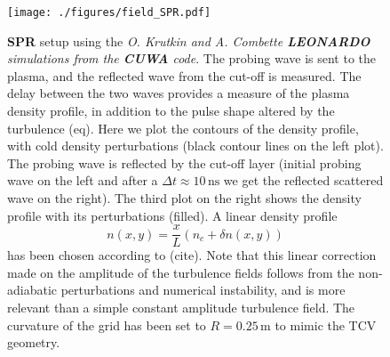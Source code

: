 \documentclass[11pt,a4paper,openany]{report}
\begin{document}
\begin{figure}[H]
    \centering
    \hspace*{-.17cm}\texttt{[image: ./figures/field\_SPR.pdf]}
    \caption{\textbf{SPR} setup using the \emph{O. Krutkin and A. Combette \textbf{LEONARDO} simulations from the \textbf{CUWA} code}. The probing wave is sent to the plasma, and the reflected wave from the cut-off is measured. The delay between the two waves provides a measure of the plasma density profile, in addition to the pulse shape altered by the turbulence (eq). Here we plot the contours of the density profile, with cold density perturbations (black contour lines on the left plot). The probing wave is reflected by the cut-off layer (initial probing wave on the left and after a $\Delta t \approx 10 \, \text{ns}$ we get the reflected scattered wave on the right). The third plot on the right shows the density profile with its perturbations (filled). A linear density profile $$n(x,y) = \frac{x}{L} \left(n_c + \delta n(x,y)\right)$$ has been chosen according to (cite). Note that this linear correction made on the amplitude of the turbulence fields follows from the non-adiabatic perturbations \cite{San_diego} and numerical instability, and is more relevant than a simple constant amplitude turbulence field. The curvature of the grid has been set to $R = 0.25 \, \text{m}$ to mimic the TCV geometry.}
    \label{}
\end{figure}
\end{document}
